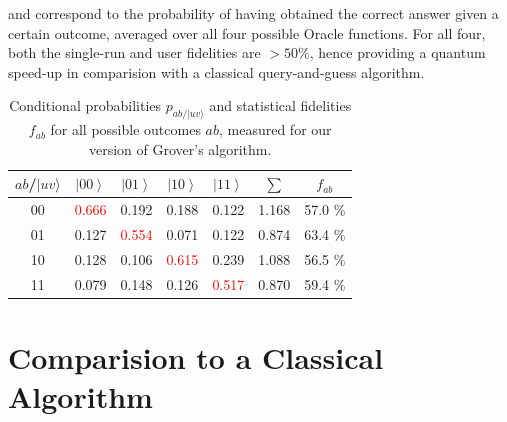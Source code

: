 and correspond to the probability of having obtained the correct answer given a certain outcome, averaged over all four possible Oracle functions. For all four, both the single-run and user fidelities are $> 50 \%$, hence providing a quantum speed-up in comparision with a classical query-and-guess algorithm.

\begin{table}[H]
\begin{centering}
\begin{tabular}{|c|c|c|c|c|c|c|}
\hline 
$ab$/$|uv\rangle$ & $\left|00\right\rangle $ & $\left|01\right\rangle $ & $\left|10\right\rangle $ & $\left|11\right\rangle $ & $\sum$ & $f_{ab}$\tabularnewline
\hline
\hline 
00 & \textcolor{red}{0.666} & 0.192 & 0.188 & 0.122 & 1.168 & 57.0 \%\tabularnewline
\hline 
01 & 0.127 & \textcolor{red}{0.554} & 0.071 & 0.122 & 0.874 & 63.4 \%\tabularnewline
\hline 
10 & 0.128 & 0.106 & \textcolor{red}{0.615} & 0.239 & 1.088 & 56.5 \%\tabularnewline
\hline 
11 & 0.079 & 0.148 & 0.126 & \textcolor{red}{0.517} & 0.870 & 59.4 \%\tabularnewline
\hline
\end{tabular}
\par\end{centering}

\caption{\label{tab:Probabilities-for-obtaining}Conditional probabilities
$p_{ab/|uv\rangle}$ and statistical fidelities $f_{ab}$ for all
possible outcomes $ab$, measured for our version of Grover's algorithm.}

\end{table}

\section{Comparision to a Classical Algorithm}


